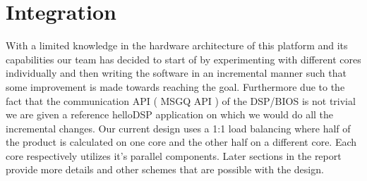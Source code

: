 \section{Integration}
With a limited knowledge in the hardware architecture of this platform and its capabilities our team has decided to start of by experimenting with different cores individually and then writing the software in an incremental manner such that some improvement is made towards reaching the goal. Furthermore due to the fact that the communication API ( MSGQ API ) of the DSP/BIOS is not trivial we are given a reference helloDSP application on which we would do all the incremental changes.
Our current design uses a 1:1 load balancing where half of the product is calculated on one core and the other half on a different core. Each core respectively utilizes it's parallel components. Later sections in the report provide more details and other schemes that are possible with the design.